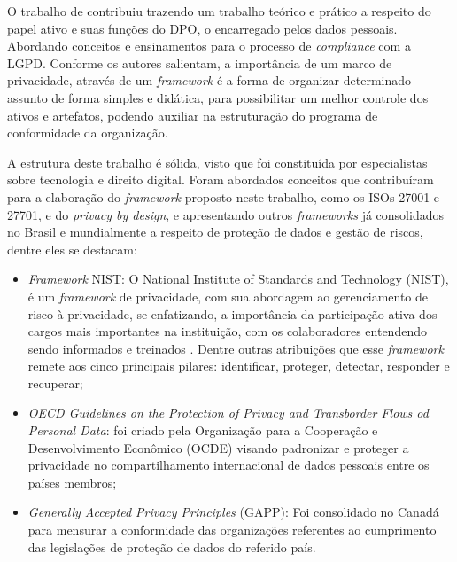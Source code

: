 \documentclass[
	12pt,				%
	openright,			%
	oneside,			%
	a4paper,			%
	english,			%
	french,				%
	spanish,			%
	brazil,				%
	]{abntex2}
\begin{document}
O trabalho de \cite{Blum2020} contribuiu trazendo um trabalho teórico e prático a respeito do papel ativo e suas funções do DPO, o encarregado pelos dados pessoais. Abordando conceitos e ensinamentos para o processo de \textit{compliance} com a LGPD. Conforme os autores salientam, a importância de um marco de privacidade, através de um \textit{framework} é a forma de organizar determinado assunto de forma simples e didática, para possibilitar um melhor controle dos ativos e artefatos, podendo auxiliar na estruturação do programa de conformidade da organização.

A estrutura deste trabalho é sólida, visto que foi constituída por especialistas sobre tecnologia e direito digital. Foram abordados conceitos que contribuíram para a elaboração do \textit{framework} proposto neste trabalho, como os ISOs 27001 e 27701, e do \textit{privacy by design}, e apresentando outros \textit{frameworks} já consolidados no Brasil e mundialmente a respeito de proteção de dados e gestão de riscos, dentre eles se destacam:

\begin{itemize}
\item \textit{Framework} NIST: O National Institute of Standards and Technology  (NIST), é um \textit{framework} de privacidade, com sua abordagem ao gerenciamento de risco à privacidade, se enfatizando, a importância da participação ativa dos cargos mais importantes na instituição, com os colaboradores entendendo sendo informados e treinados \cite{Blum2020}. Dentre outras atribuições que esse \textit{framework} remete aos cinco principais pilares: identificar, proteger, detectar, responder e recuperar; 
\item \textit{OECD Guidelines on the Protection of Privacy and Transborder Flows od Personal Data}: foi criado pela Organização para a Cooperação e Desenvolvimento Econômico (OCDE) visando padronizar e proteger a privacidade no compartilhamento internacional de dados pessoais entre os países membros;
\item \textit{Generally Accepted Privacy Principles} (GAPP): Foi consolidado no Canadá para mensurar a conformidade das organizações referentes ao cumprimento das legislações de proteção de dados do referido país. 

\end{itemize}

\end{document}
